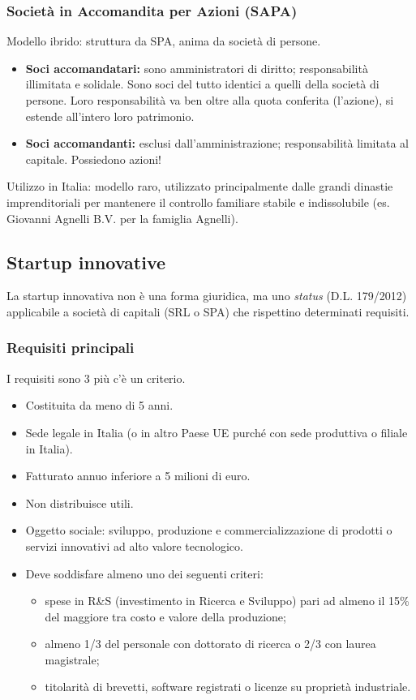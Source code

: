 \documentclass[a4paper,12pt]{article}
\begin{document}
	\subsubsection{Società in Accomandita per Azioni (SAPA)}
	
	Modello ibrido: struttura da SPA, anima da società di persone.
	
	\begin{itemize}
		\item \textbf{Soci accomandatari:} sono amministratori di diritto; responsabilità illimitata e solidale. Sono soci del tutto identici a quelli della società di persone. Loro responsabilità va ben oltre alla quota conferita (l'azione), si estende all'intero loro patrimonio.
		\item \textbf{Soci accomandanti:} esclusi dall'amministrazione; responsabilità limitata al capitale. Possiedono azioni!
	\end{itemize}
	
	Utilizzo in Italia: modello raro, utilizzato principalmente dalle grandi dinastie imprenditoriali per mantenere il controllo familiare stabile e indissolubile (es. Giovanni Agnelli B.V. per la famiglia Agnelli).
	
	\subsection{Startup innovative}
	
	La startup innovativa non è una forma giuridica, ma uno \emph{status} (D.L. 179/2012) applicabile a società di capitali (SRL o SPA) che rispettino determinati requisiti. 
	
	\subsubsection{Requisiti principali}
	I requisiti sono 3 più c'è un criterio.
	\begin{itemize}
		\item Costituita da meno di 5 anni.
		\item Sede legale in Italia (o in altro Paese UE purché con sede produttiva o filiale in Italia).
		\item Fatturato annuo inferiore a 5 milioni di euro.
		\item Non distribuisce utili.
		\item Oggetto sociale: sviluppo, produzione e commercializzazione di prodotti o servizi innovativi ad alto valore tecnologico.
		\item Deve soddisfare almeno uno dei seguenti criteri:
		\begin{itemize}
			\item spese in R\&S (investimento in Ricerca e Sviluppo) pari ad almeno il 15\% del maggiore tra costo e valore della produzione;
			\item almeno 1/3 del personale con dottorato di ricerca o 2/3 con laurea magistrale;
			\item titolarità di brevetti, software registrati o licenze su proprietà industriale.
		\end{itemize}
	\end{itemize}
	
\end{document}
